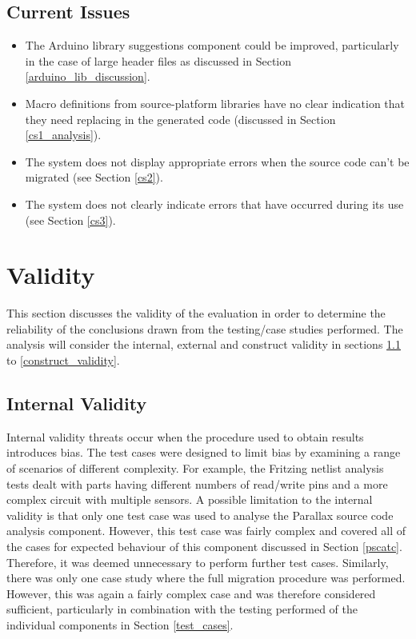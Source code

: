 \documentclass{UoYCSproject}
\begin{document}
\subsection{Current Issues} \label{current_issues}
\begin{itemize}
\item The Arduino library suggestions component could be improved, particularly in the case of large header files as discussed in Section \ref{arduino_lib_discussion}.
\item Macro definitions from source-platform libraries have no clear indication that they need replacing in the generated code (discussed in Section \ref{cs1_analysis}).
\item The system does not display appropriate errors when the source code can't be migrated (see Section \ref{cs2}).
\item The system does not clearly indicate errors that have occurred during its use (see Section \ref{cs3}).
\end{itemize}

\section{Validity} \label{eval_limits}
This section discusses the validity of the evaluation in order to determine the reliability of the conclusions drawn from the testing/case studies performed. The analysis will consider the internal, external and construct validity in sections \ref{internal_validity} to \ref{construct_validity}.

\subsection{Internal Validity} \label{internal_validity}
Internal validity threats occur when the procedure used to obtain results introduces bias. The test cases were designed to limit bias by examining a range of scenarios of different complexity. For example, the Fritzing netlist analysis tests dealt with parts having different numbers of read/write pins and a more complex circuit with multiple sensors. A possible limitation to the internal validity is that only one test case was used to analyse the Parallax source code analysis component.  However, this test case was fairly complex and covered all of the cases for expected behaviour of this component discussed in Section \ref{pscatc}. Therefore, it was deemed unnecessary to perform further test cases. Similarly, there was only one case study where the full migration procedure was performed. However, this was again a fairly complex case and was therefore considered sufficient, particularly in combination with the testing performed of the individual components in Section \ref{test_cases}.
\end{document}
